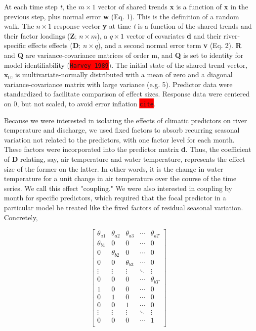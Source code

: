 \documentclass{article}
\begin{document}
At each time step {\it t}, the $m \times 1$ vector of shared trends \textbf{x} is a function of \textbf{x} in the previous step, plus normal error \textbf{w} (Eq. 1). This is the definition of a random walk. The $n\times 1$ response vector \textbf{y} at time {\it t} is a function of the shared trends and their factor loadings (\textbf{Z}; $n\times m$), a $q\times 1$ vector of covariates \textbf{d} and their river-specific effects effects (\textbf{D}; $n\times q$), and a second normal error term \textbf{v} (Eq. 2). \textbf{R} and \textbf{Q} are variance-covariance matrices of order m, and \textbf{Q} is set to identity for model identifiability (\colorbox{red}{\lstinline{Harvey 1989}}). The initial state of the shared trend vector, $\bm{x}_0$, is multivariate-normally distributed with a mean of zero and a diagonal variance-covariance matrix with large variance (e.g. 5). Predictor data were standardized to facilitate comparison of effect sizes. Response data were centered on 0, but not scaled, to avoid error inflation \colorbox{red}{\lstinline{cite}}.

Because we were interested in isolating the effects of climatic predictors on river temperature and discharge, we used fixed factors to absorb recurring seasonal variation not related to the predictors, with one factor level for each month. These factors were incorporated into the predictor matrix \textbf{d}. Thus, the coefficient of \textbf{D} relating, say, air temperature and water temperature, represents the effect size of the former on the latter. In other words, it is the change in water temperature for a unit change in air temperature over the course of the time series. We call this effect "coupling." We were also interested in coupling by month for specific predictors, which required that the focal predictor in a particular model be treated like the fixed factors of residual seasonal variation. Concretely,

$$
\begin{bmatrix} 
    \theta_{a1} & \theta_{a2} & \theta_{a3} & \cdots & \theta_{aT} \\
    \theta_{b1} & 0 & 0 & \cdots & 0 \\ 
    0 & \theta_{b2} & 0 & \cdots & 0 \\
    0 & 0 & \theta_{b3} & \cdots & 0 \\
    \vdots & \vdots & \vdots & \ddots & \vdots \\
    0 & 0 & 0 & \cdots & \theta_{bT} \\
    1 & 0 & 0 & \cdots & 0 \\ 
    0 & 1 & 0 & \cdots & 0 \\
    0 & 0 & 1 & \cdots & 0 \\
    \vdots & \vdots & \vdots & \ddots & \vdots \\
    0 & 0 & 0 & \cdots & 1 \\
\end{bmatrix}
$$
\end{document}
